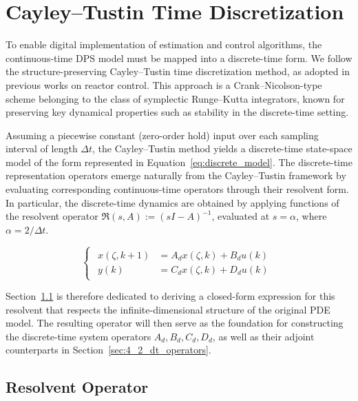 \section{Cayley--Tustin Time Discretization} \label{sec:4_dt}

To enable digital implementation of estimation and control algorithms, the continuous-time DPS model must be mapped into a discrete-time form. We follow the structure-preserving Cayley--Tustin time discretization method, as adopted in previous works on reactor control\autocite{Khatibi2021Model, Moadeli2025Model,Moadeli2025Observer}. This approach is a Crank--Nicolson-type scheme belonging to the class of symplectic Runge--Kutta integrators, known for preserving key dynamical properties such as stability in the discrete-time setting\autocite{havu2007cayley, hairer2006geometric}.

Assuming a piecewise constant (zero-order hold) input over each sampling interval of length $\Delta t$, the Cayley--Tustin method yields a discrete-time state-space model of the form represented in Equation~\eqref{eq:discrete_model}. The discrete-time representation operators emerge naturally from the Cayley--Tustin framework by evaluating corresponding continuous-time operators through their resolvent form. In particular, the discrete-time dynamics are obtained by applying functions of the resolvent operator $\mathfrak{R}(s, A) := (sI - A)^{-1}$, evaluated at $s = \alpha$, where $\alpha = 2 / \Delta t$.

\begin{equation} \label{eq:discrete_model}
    \begin{cases}
        \begin{aligned}
        x(\zeta, k{+}1) &= A_d x(\zeta, k) + B_d u(k)\\
        y(k) & = C_d x(\zeta, k) + D_d u(k)
        \end{aligned}
    \end{cases}
\end{equation}

Section~\ref{sec:4_1_resolvent} is therefore dedicated to deriving a closed-form expression for this resolvent that respects the infinite-dimensional structure of the original PDE model. The resulting operator will then serve as the foundation for constructing the discrete-time system operators $A_d, B_d, C_d, D_d$, as well as their adjoint counterparts in Section~\ref{sec:4_2_dt_operators}.


\subsection{Resolvent Operator} \label{sec:4_1_resolvent}

